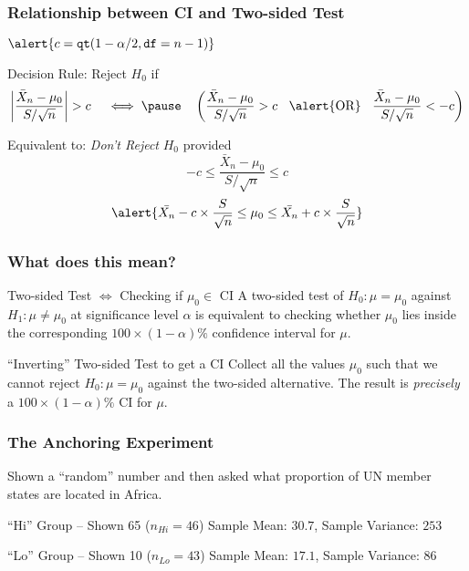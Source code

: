 \documentclass{beamer}
\begin{document}
\begin{frame}
\frametitle{Relationship between CI and Two-sided Test}
$\alert{c =  \texttt{qt}(1-\alpha/2, \texttt{df}=n-1)}$
\begin{block}{Decision Rule: Reject $H_0$ if}
		$$\left|\frac{\bar{X}_n - \mu_0}{S/\sqrt{n}} \right|> c \quad \iff \pause  \quad \left(\frac{\bar{X}_n - \mu_0}{S/\sqrt{n}}> c \;\;\mbox{  \alert{OR}  }\;\;\frac{\bar{X}_n - \mu_0}{S/\sqrt{n}}< - c\right)$$
\end{block}

\pause
\begin{block}{Equivalent to: \emph{Don't Reject} $H_0$ provided}
	$$-c \leq \frac{\bar{X}_n - \mu_0}{S/\sqrt{n}}\leq c $$ \pause
	$$\alert{\bar{X_n} - c\times \frac{S}{\sqrt{n}} \leq \mu_0 \leq \bar{X_n} + c\times \frac{S}{\sqrt{n}}}$$
\end{block}
\end{frame}
\begin{frame}
\frametitle{What does this mean?}

\begin{block}
	{Two-sided Test $\iff$ Checking if $\mu_0 \in$ CI}
	A two-sided test of $H_0\colon \mu = \mu_0$ against $H_1\colon \mu\neq \mu_0 $ at significance level $\alpha$ is equivalent to checking whether $\mu_0$ lies inside the corresponding $100\times (1-\alpha)\%$ confidence interval for $\mu$.
\end{block}

\pause

\begin{block}
	{``Inverting'' Two-sided Test to get a CI}	
	Collect all the values $\mu_0$ such that we cannot reject $H_0\colon \mu = \mu_0$ against the two-sided alternative. The result is \emph{precisely} a $100\times (1-\alpha)\%$ CI for $\mu$.
\end{block}
\end{frame}

\begin{frame}
\frametitle{The Anchoring Experiment}
Shown a ``random'' number and then asked what proportion of UN member states are located in Africa.
	\begin{block}{``Hi'' Group -- Shown 65 ($n_{Hi}=46$)}
		Sample Mean: $30.7$, Sample Variance: $253$
\end{block}


	\begin{block}{``Lo'' Group -- Shown 10 ($n_{Lo}=43$)}
	Sample Mean: $17.1$, Sample Variance: $86$
\end{block}


\vspace{1em}

\hfill\alert{}
\end{frame}
\end{document}
